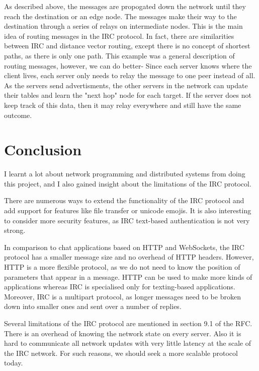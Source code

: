 \documentclass[letterpaper,twocolumn,10pt]{article}
\begin{document}
As described above, the messages are propogated down the network until they reach
the destination or an edge node. The messages make their way to the destination
through a series of relays on intermediate nodes. This is the main idea of routing
messages in the IRC protocol. In fact, there are similarities between IRC and
distance vector routing, except there is no concept of shortest paths, as there is only one path.
This example was a general description of routing
messages, however, we can do better- Since each server knows where the client lives,
each server only needs to relay the message to one peer instead of all. As the servers
send advertisments, the other servers in the network can update their tables and learn
the "next hop" node for each target. If the server does not keep track of this data,
then it may relay everywhere and still have the same outcome.

\section{Conclusion}

I learnt a lot about network programming and distributed
systems from doing this project, and I also gained insight about the limitations
of the IRC protocol.

There are numerous ways to extend the functionality of the IRC
protocol and add support for features like file transfer or unicode emojis.
It is also interesting to consider more security features, as IRC
text-based authentication is not very strong.

In comparison to chat applications based on HTTP and WebSockets, the IRC
protocol has a smaller message size and no overhead of HTTP headers.
However, HTTP is a more flexible protocol, as we do not need
to know the position of parameters that appear in a message.
HTTP can be used to make more kinds of applications whereas IRC is specialised
only for texting-based applications. Moreover, IRC is a multipart protocol, as
longer messages need to be broken down into smaller ones and sent over a number
of replies.

Several limitations of the IRC protocol are mentioned in section 9.1 of the
RFC. There is an overhead of knowing the network state on every server. Also
it is hard to communicate all network updates with very little latency at the scale
of the IRC network. For such reasons, we should seek a more scalable protocol today.
\end{document}
